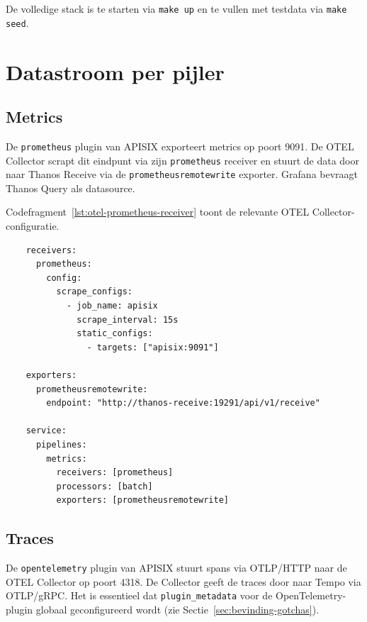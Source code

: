 De volledige stack is te starten via \texttt{make up} en te vullen met testdata via \texttt{make seed}.

\section{Datastroom per pijler}%
\label{sec:poc-datastroom}

\subsection{Metrics}

De \texttt{prometheus} plugin van APISIX exporteert metrics op poort 9091. De OTEL Collector scrapt dit eindpunt via zijn \texttt{prometheus} receiver en stuurt de data door naar Thanos Receive via de \texttt{prometheusremotewrite} exporter. Grafana bevraagt Thanos Query als datasource.

Codefragment~\ref{lst:otel-prometheus-receiver} toont de relevante OTEL Collector-configuratie.

\begin{listing}
  \begin{verbatim}
    receivers:
      prometheus:
        config:
          scrape_configs:
            - job_name: apisix
              scrape_interval: 15s
              static_configs:
                - targets: ["apisix:9091"]

    exporters:
      prometheusremotewrite:
        endpoint: "http://thanos-receive:19291/api/v1/receive"

    service:
      pipelines:
        metrics:
          receivers: [prometheus]
          processors: [batch]
          exporters: [prometheusremotewrite]
  \end{verbatim}
  \caption[OTEL Collector: metrics-pipeline configuratie.]{OTEL Collector configuratie voor de metrics-pipeline: scrapen van APISIX en doorsturen naar Thanos.}
  \label{lst:otel-prometheus-receiver}
\end{listing}

\subsection{Traces}

De \texttt{opentelemetry} plugin van APISIX stuurt spans via OTLP/HTTP naar de OTEL Collector op poort 4318. De Collector geeft de traces door naar Tempo via OTLP/gRPC. Het is essentieel dat \texttt{plugin\_metadata} voor de OpenTelemetry-plugin globaal geconfigureerd wordt (zie Sectie~\ref{sec:bevinding-gotchas}).


